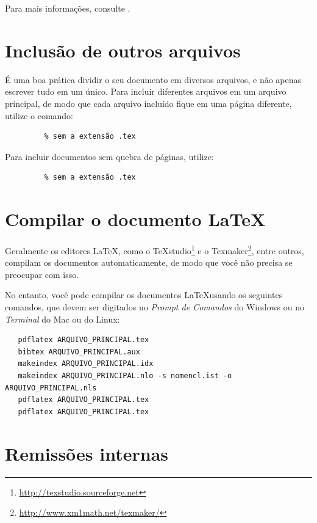 \documentclass[12pt,oneside,a4paper,chapter=TITLE,english,brazil]{abntex2}
\begin{document}
\begin{anexosenv}
Para mais informações, consulte .

\section{Inclusão de outros arquivos}\label{sec-include}

É uma boa prática dividir o seu documento em diversos arquivos, e não apenas escrever tudo em um único. Para incluir diferentes arquivos em um arquivo principal, de modo que cada arquivo incluído fique em uma página diferente, utilize o comando:
\begin{verbatim}
         % sem a extensão .tex
\end{verbatim}

Para incluir documentos sem quebra de páginas, utilize:
\begin{verbatim}
         % sem a extensão .tex
\end{verbatim}

\section{Compilar o documento \LaTeX}

Geralmente os editores \LaTeX, como o TeXstudio\footnote{\url{http://texstudio.sourceforge.net}} e o Texmaker\footnote{\url{http://www.xm1math.net/texmaker/}}, entre outros, compilam os documentos automaticamente, de modo que você não precisa se preocupar com isso.

No entanto, você pode compilar os documentos \LaTeX usando os seguintes comandos, que devem ser digitados no \emph{Prompt de Comandos} do Windows ou no \emph{Terminal} do Mac ou do Linux:
\begin{verbatim}
   pdflatex ARQUIVO_PRINCIPAL.tex
   bibtex ARQUIVO_PRINCIPAL.aux
   makeindex ARQUIVO_PRINCIPAL.idx 
   makeindex ARQUIVO_PRINCIPAL.nlo -s nomencl.ist -o ARQUIVO_PRINCIPAL.nls
   pdflatex ARQUIVO_PRINCIPAL.tex
   pdflatex ARQUIVO_PRINCIPAL.tex
\end{verbatim}

\section{Remissões internas}


\end{anexosenv}
\end{document}
